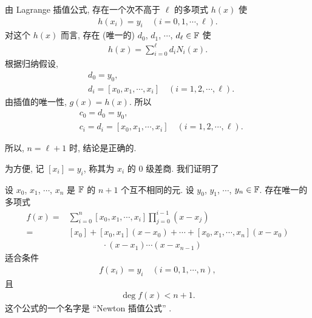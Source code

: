 \begin{pf}
    由 Lagrange 插值公式, 存在一个次不高于 $\ell$ 的多项式 $h(x)$ 使
    \begin{align*}
        h(x_i) = y_i \quad (i = 0,1,\cdots,\ell).
    \end{align*}
    对这个 $h(x)$ 而言, 存在 (唯一的) $d_0$, $d_1$, $\cdots$, $d_{\ell} \in \mathbb{F}$ 使
    \begin{align*}
        h(x) = \sum_{i = 0}^{\ell} d_i N_{i} (x).
    \end{align*}
    根据归纳假设,
    \begin{align*}
         & d_0 = y_0,                                                 \\
         & d_i = [x_0, x_1, \cdots, x_i] \quad (i = 1,2,\cdots,\ell).
    \end{align*}
    由插值的唯一性, $g(x) = h(x)$. 所以
    \begin{align*}
         & c_0 = d_0 = y_0,                                                 \\
         & c_i = d_i = [x_0, x_1, \cdots, x_i] \quad (i = 1,2,\cdots,\ell).
    \end{align*}

    所以, $n = \ell + 1$ 时, 结论是正确的.
\end{pf}

为方便, 记 $[x_i] = y_i$, 称其为 $x_i$ 的 $0$ 级差商. 我们证明了

\begin{proposition}
    设 $x_0$, $x_1$, $\cdots$, $x_{n}$ 是 $\mathbb{F}$ 的 $n+1$ 个互不相同的元. 设 $y_0$, $y_1$, $\cdots$, $y_{n} \in \mathbb{F}$. 存在唯一的多项式
    \begin{align*}
        f(x)
        = {} & \sum_{i = 0}^{n} [x_0, x_1, \cdots, x_i]
        \prod_{j = 0}^{i - 1} (x - x_j)                                                \\
        = {} & [x_0] + [x_0, x_1] (x - x_0) + \cdots + [x_0, x_1, \cdots, x_n] (x-x_0) \\
             & \qquad \qquad \cdot (x-x_1)\cdots (x-x_{n-1})
    \end{align*}
    适合条件
    \begin{align*}
        f(x_i) = y_i \quad (i = 0,1,\cdots,n),
    \end{align*}
    且
    \begin{align*}
        \deg f(x) < n + 1.
    \end{align*}
    这个公式的一个名字是 ``Newton 插值公式'' .
\end{proposition}

